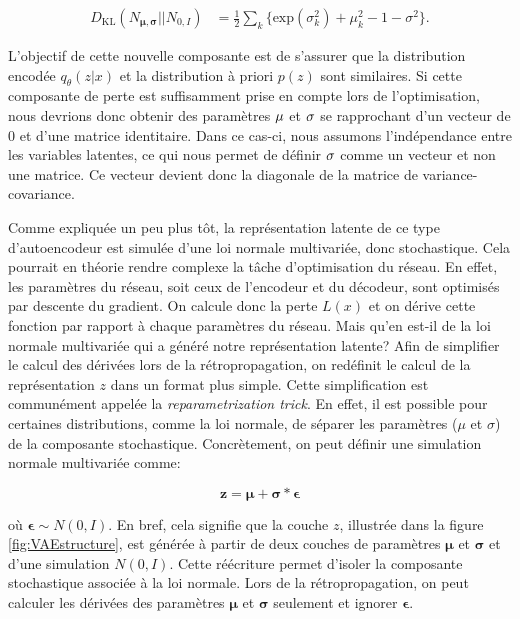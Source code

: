 \begin{equation}  \label{eq:kl4}
\begin{aligned}
D_{\text{KL}}(N_{\boldsymbol \mu, \boldsymbol \sigma} || N_{0,I}) &= \frac{1}{2} \sum_{k}\Big\{\text{exp}(\sigma_{k}^2) + \mu_{k}^2 - 1 - \sigma^2\Big\}.
\end{aligned}
\end{equation}


 L'objectif de cette nouvelle composante est de s'assurer que la distribution encodée $q_{\theta}(z|x)$ et la distribution à priori $p(z)$ sont similaires. Si cette composante de perte est suffisamment prise en compte lors de l'optimisation, nous devrions donc obtenir des paramètres $\boldmath \mu$ et $\boldmath \sigma$ se rapprochant d'un vecteur de 0 et d'une matrice identitaire. Dans ce cas-ci, nous assumons l'indépendance entre les variables latentes, ce qui nous permet de définir $\boldmath \sigma$ comme un vecteur et non une matrice. Ce vecteur devient donc la diagonale de la matrice de variance-covariance.

Comme expliquée un peu plus tôt, la représentation latente de ce type d'autoencodeur est simulée d'une loi normale multivariée, donc stochastique. Cela pourrait en théorie rendre complexe la tâche d'optimisation du réseau. En effet, les paramètres du réseau, soit ceux de l'encodeur et du décodeur, sont optimisés par descente du gradient. On calcule donc la perte $L(x)$ et on dérive cette fonction par rapport à chaque paramètres du réseau. Mais qu'en est-il de la loi normale multivariée qui a généré notre représentation latente? Afin de simplifier le calcul des dérivées lors de la rétropropagation, on redéfinit le calcul de la représentation $z$ dans un format plus simple. Cette simplification est communément appelée la  \textit{reparametrization trick}. En effet, il est possible pour certaines distributions, comme la loi normale, de séparer les paramètres ($\mu$ et $\sigma$)  de la composante stochastique. Concrètement, on peut définir une simulation normale multivariée comme:

\begin{equation} \label{eq:latent_formula}
\boldsymbol{z} = \boldsymbol{\mu} + \boldsymbol{\sigma} *\boldsymbol{\epsilon}
\end{equation}

où $\boldsymbol{\epsilon} \sim N(0,I)$. En bref, cela signifie que la couche $z$, illustrée dans la figure \ref{fig:VAEstructure}, est générée à partir de deux couches de paramètres $\boldsymbol{\mu}$ et $\boldsymbol{\sigma}$ et d'une simulation $N(0,I)$. Cette réécriture permet d'isoler la composante stochastique associée à la loi normale. Lors de la rétropropagation, on peut calculer les dérivées des paramètres $\boldsymbol{\mu}$ et $\boldsymbol{\sigma}$ seulement et ignorer $\boldsymbol{\epsilon}$. 

